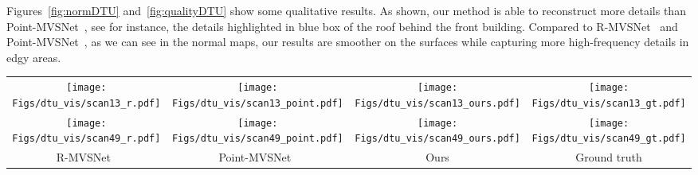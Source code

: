 Figures~\ref{fig:normDTU} and~\ref{fig:qualityDTU} show some qualitative results. As shown, our method is able to reconstruct more details than Point-MVSNet~\cite{chen2019point}, see for instance, the details highlighted in blue box of the roof behind the front building. Compared to R-MVSNet~\cite{yao2019recurrent} and Point-MVSNet~\cite{chen2019point}, as we can see in the normal maps, our results are smoother on the surfaces while capturing more high-frequency details in edgy areas. 
\begin{figure*}[!ht]
    \begin{center}
    \setlength\tabcolsep{3pt}
    \begin{tabular}{cccc}
          \texttt{[image: Figs/dtu\_vis/scan13\_r.pdf]}
          & \texttt{[image: Figs/dtu\_vis/scan13\_point.pdf]}
          & \texttt{[image: Figs/dtu\_vis/scan13\_ours.pdf]}
          & \texttt{[image: Figs/dtu\_vis/scan13\_gt.pdf]}\\
          \texttt{[image: Figs/dtu\_vis/scan49\_r.pdf]}
          & \texttt{[image: Figs/dtu\_vis/scan49\_point.pdf]}
          & \texttt{[image: Figs/dtu\_vis/scan49\_ours.pdf]}
          & \texttt{[image: Figs/dtu\_vis/scan49\_gt.pdf]}\\
          R-MVSNet~\cite{yao2019recurrent} & Point-MVSNet~\cite{chen2019point} & Ours & Ground truth
    \end{tabular}
    \end{center}
    \vspace{-0.5cm}
    \caption{Additional results from DTU dataset. Best viewed on screen.}
    \label{fig:qualityDTU}
    \vspace{-0.4cm}
\end{figure*}
\begin{figure*}[!ht]
    \begin{center}
    \end{center}
    \vspace{-0.5cm}
    \caption{Point cloud reconstruction of Tanks and Temples dataset~\cite{knapitsch2017tanks}. Best viewed on screen.}
    \label{fig:qualityTanks}
    \vspace{-0.25cm}
\end{figure*}

